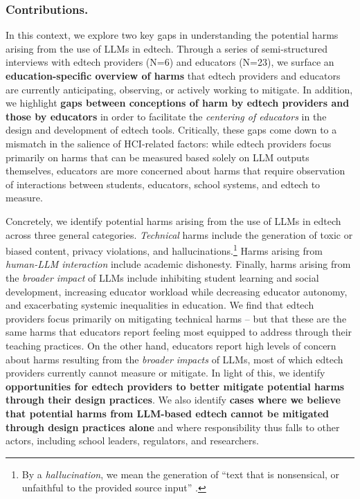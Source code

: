 \subsubsection*{Contributions.} In this context, we explore two key gaps in understanding the potential harms arising from the use of LLMs in edtech. Through a series of semi-structured interviews with edtech providers (N=6) and educators (N=23), we surface an \textbf{education-specific overview of harms} that edtech providers and educators are currently anticipating, observing, or actively working to mitigate. In addition, we highlight \textbf{gaps between conceptions of harm by edtech providers and those by educators} in order to facilitate the \textit{centering of educators} in the design and development of edtech tools. Critically, these gaps come down to a mismatch in the salience of HCI-related factors: while edtech providers focus primarily on harms that can be measured based solely on LLM outputs themselves, educators are more concerned about harms that require observation of interactions between students, educators, school systems, and edtech to measure.

Concretely, we identify potential harms arising from the use of LLMs in edtech across three general categories. \textit{Technical} harms include the generation of toxic or biased content, privacy violations, and hallucinations.\footnote{By a \textit{hallucination}, we mean the generation of ``text that is nonsensical, or unfaithful to the provided source input'' \cite{ji_survey_2023}.} Harms arising from \textit{human-LLM interaction} include academic dishonesty. Finally, harms arising from the \textit{broader impact} of LLMs include inhibiting student learning and social development, increasing educator workload while decreasing educator autonomy, and exacerbating systemic inequalities in education. We find that edtech providers focus primarily on mitigating technical harms -- but that these are the same harms that educators report feeling most equipped to address through their teaching practices. On the other hand, educators report high levels of concern about harms resulting from the \textit{broader impacts} of LLMs, most of which edtech providers currently cannot measure or mitigate. In light of this, we identify \textbf{opportunities for edtech providers to better mitigate potential harms through their design practices}. We also identify \textbf{cases where we believe that potential harms from LLM-based edtech cannot be mitigated through design practices alone} and where responsibility thus falls to other actors, including school leaders, regulators, and researchers.

